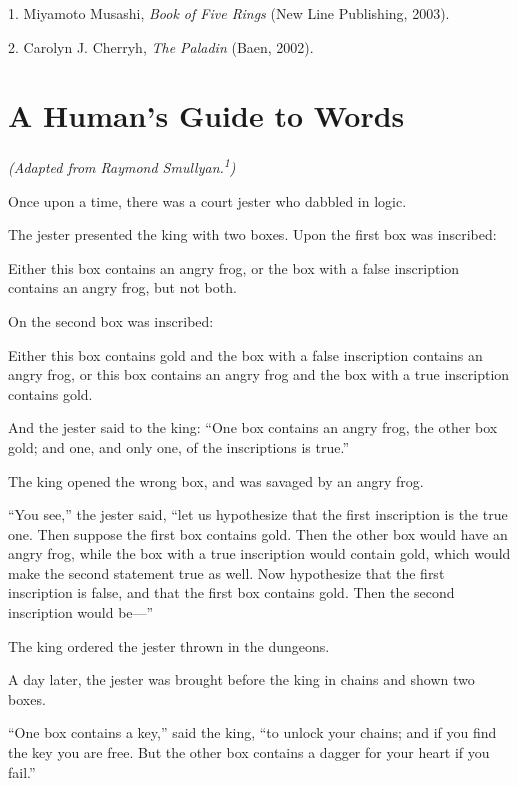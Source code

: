 \bigskip

{
 1. Miyamoto Musashi, \textit{Book of Five Rings} (New Line
Publishing, 2003).}

{
 2. Carolyn J. Cherryh, \textit{The Paladin} (Baen, 2002).}

\chapter{A Human's Guide to Words}


{
 \textit{(Adapted from Raymond
Smullyan.}\textit{\textsuperscript{1}}\textit{)} }

{
 Once upon a time, there was a court jester who dabbled in logic.}

{
 The jester presented the king with two boxes. Upon the first box
was inscribed:}

{
 Either this box contains an angry frog, or the box with a false
inscription contains an angry frog, but not both.}

{
 On the second box was inscribed:}

{
 Either this box contains gold and the box with a false inscription
contains an angry frog, or this box contains an angry frog and the box
with a true inscription contains gold.}

{
 And the jester said to the king: ``One box
contains an angry frog, the other box gold; and one, and only one, of
the inscriptions is true.''}

{
 The king opened the wrong box, and was savaged by an angry frog.}

{
 ``You see,'' the jester said,
``let us hypothesize that the first inscription is the
true one. Then suppose the first box contains gold. Then the other box
would have an angry frog, while the box with a true inscription would
contain gold, which would make the second statement true as well. Now
hypothesize that the first inscription is false, and that the first box
contains gold. Then the second inscription would
be---''}

{
 The king ordered the jester thrown in the dungeons.}

{
 A day later, the jester was brought before the king in chains and
shown two boxes.}

{
 ``One box contains a key,''
said the king, ``to unlock your chains; and if you
find the key you are free. But the other box contains a dagger for your
heart if you fail.''}

